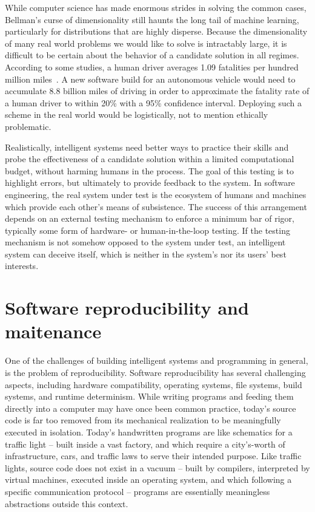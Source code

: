 \documentclass[12pt,initial,twoside,maitrise]{dms}
\numberwithin{equation}{section}
\numberwithin{table}{chapter}
\numberwithin{figure}{chapter}
\begin{document}
While computer science has made enormous strides in solving the common cases, Bellman's curse of dimensionality still haunts the long tail of machine learning, particularly for distributions that are highly disperse. Because the dimensionality of many real world problems we would like to solve is intractably large, it is difficult to be certain about the behavior of a candidate solution in all regimes. According to some studies, a human driver averages 1.09 fatalities per hundred million miles~\cite{kalra2016driving}. A new software build for an autonomous vehicle would need to accumulate 8.8 billion miles of driving in order to approximate the fatality rate of a human driver to within 20\% with a 95\% confidence interval. Deploying such a scheme in the real world would be logistically, not to mention ethically problematic.

Realistically, intelligent systems need better ways to practice their skills and probe the effectiveness of a candidate solution within a limited computational budget, without harming humans in the process. The goal of this testing is to highlight errors, but ultimately to provide feedback to the system. In software engineering, the real system under test is the ecosystem of humans and machines which provide each other's means of subsistence. The success of this arrangement depends on an external testing mechanism to enforce a minimum bar of rigor, typically some form of hardware- or human-in-the-loop testing. If the testing mechanism is not somehow opposed to the system under test, an intelligent system can deceive itself, which is neither in the system's nor its users' best interests.

\section{Software reproducibility and maitenance}

One of the challenges of building intelligent systems and programming in general, is the problem of reproducibility. Software reproducibility has several challenging aspects, including hardware compatibility, operating systems, file systems, build systems, and runtime determinism. While writing programs and feeding them directly into a computer may have once been common practice, today's source code is far too removed from its mechanical realization to be meaningfully executed in isolation. Today's handwritten programs are like schematics for a traffic light -- built inside a vast factory, and which require a city's-worth of infrastructure, cars, and traffic laws to serve their intended purpose. Like traffic lights, source code does not exist in a vacuum -- built by compilers, interpreted by virtual machines, executed inside an operating system, and which following a specific communication protocol -- programs are essentially meaningless abstractions outside this context.
\end{document}
